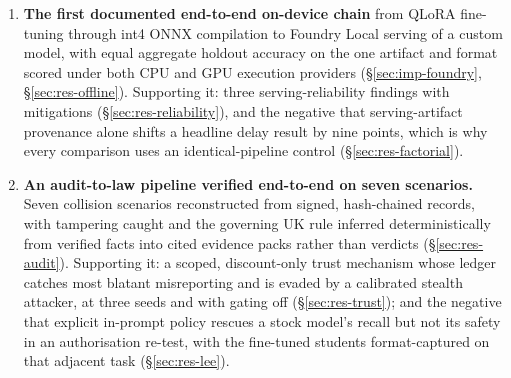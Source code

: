 \begin{enumerate}
\item \textbf{The first documented end-to-end on-device chain} from QLoRA
fine-tuning through int4 ONNX compilation to Foundry Local serving of a
custom model, with equal aggregate holdout accuracy on the one artifact
and format scored under both CPU and GPU execution providers
(\S\ref{sec:imp-foundry}, \S\ref{sec:res-offline}). Supporting it: three
serving-reliability findings with mitigations
(\S\ref{sec:res-reliability}), and the negative that serving-artifact
provenance alone shifts a headline delay result by nine points, which is
why every comparison uses an identical-pipeline control
(\S\ref{sec:res-factorial}).
\item \textbf{An audit-to-law pipeline verified end-to-end on seven
scenarios.} Seven collision scenarios
reconstructed from signed, hash-chained records, with tampering caught and
the governing UK rule inferred deterministically from verified facts into
cited evidence packs rather than verdicts (\S\ref{sec:res-audit}).
Supporting it: a scoped, discount-only trust mechanism whose ledger
catches most blatant misreporting and is evaded by a calibrated stealth
attacker, at three seeds and with gating off (\S\ref{sec:res-trust}); and
the negative that explicit in-prompt policy rescues a stock model's recall
but not its safety in an authorisation re-test, with the fine-tuned
students format-captured on that adjacent task (\S\ref{sec:res-lee}).
\end{enumerate}
